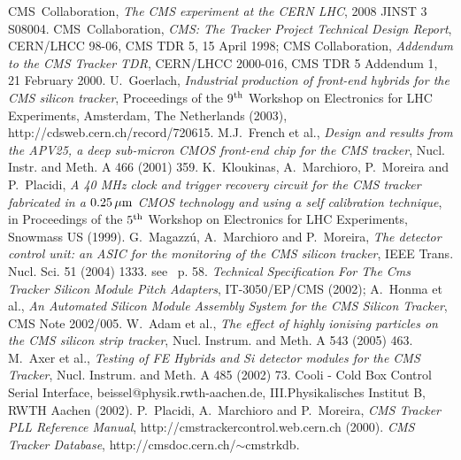 \begin{thebibliography}{9}
 CMS~Collaboration, {\em The CMS experiment at
    the CERN LHC}, 2008 JINST 3 S08004.
 CMS~Collaboration, {\em CMS: The Tracker Project
    Technical Design Report}, CERN/LHCC 98-06, CMS TDR 5, 15 April
  1998; CMS Collaboration, {\em Addendum to the CMS Tracker TDR}, CERN/LHCC
  2000-016, CMS TDR 5 Addendum 1, 21 February 2000.
 U.~Goerlach, {\em Industrial production of front-end
    hybrids for the CMS silicon tracker}, Proceedings of the 9$^{\rm
    th}$ Workshop on Electronics for LHC Experiments, Amsterdam, The
  Netherlands (2003), http://cdsweb.cern.ch/record/720615.
 M.J.~French et al., {\em Design and results from the
    APV25, a deep sub-micron CMOS front-end chip for the CMS tracker},
  Nucl. Instr. and Meth. A 466 (2001) 359.
 K.~Kloukinas, A.~Marchioro, P.~Moreira and P.~Placidi,
  {\em A 40 MHz clock and trigger recovery circuit for the CMS tracker
    fabricated in a $0.25{\, \mu \rm m}$ CMOS technology and using a self
    calibration technique}, in Proceedings of the $5^{\rm th}$
  Workshop on Electronics for LHC Experiments, Snowmass US (1999).
 G.~Magazz\'u, A.~Marchioro and P.~Moreira, {\em The
    detector control unit: an ASIC for the monitoring of the CMS
    silicon tracker}, IEEE Trans. Nucl. Sci. 51 (2004) 1333.
 see~\cite{bigcmspaper} p. 58. 
 {\em Technical Specification For The Cms Tracker Silicon
  Module Pitch Adapters}, IT-3050/EP/CMS (2002);
 A.~Honma et al., {\em An Automated Silicon Module
    Assembly System for the CMS Silicon Tracker}, CMS Note 2002/005.
 W.~Adam et al., {\em The effect of highly ionising
    particles on the CMS silicon strip tracker}, Nucl. Instrum. and
  Meth. A 543 (2005) 463.
 M.~Axer et al., {\em Testing of FE Hybrids and Si
    detector modules for the CMS Tracker}, Nucl. Instrum. and Meth. A
  485 (2002) 73.
 Cooli - Cold Box Control Serial Interface,
  beissel@physik.rwth-aachen.de, III.Physikalisches Institut B, RWTH
  Aachen (2002).
 P.~Placidi, A.~Marchioro and P.~Moreira, {\em CMS
    Tracker PLL Reference Manual},
  http://cmstrackercontrol.web.cern.ch (2000).
  {\em CMS Tracker Database}, http://cmsdoc.cern.ch/$\sim$cmstrkdb.
\end{thebibliography}
